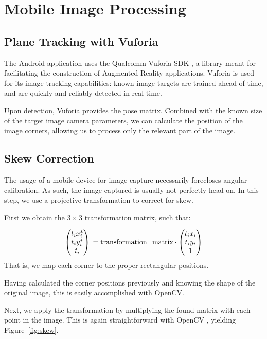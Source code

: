 \documentclass[11pt, letterpaper]{article}
\begin{document}
\section{Mobile Image Processing}

\subsection{Plane Tracking with Vuforia}
The Android application uses the Qualcomm Vuforia SDK \cite{vuforia}, a library meant for facilitating the construction of Augmented Reality applications.
Vuforia is used for its image tracking capabilities: known image targets are trained ahead of time, and are quickly and reliably detected in real-time.

Upon detection,	Vuforia provides the pose matrix. Combined with the known size of the target image camera parameters, we can calculate the position of the image corners, allowing us to process only the relevant part of the image.


\subsection{Skew Correction}
The usage of a mobile device for image capture necessarily forecloses angular calibration.
As such, the image captured is usually not perfectly head on.
In this step, we use a projective transformation to correct for skew.

First we obtain the $3 \times 3$ transformation matrix, such that:

$$
\begin{pmatrix}
t_i x_i^*\\
t_i y_i^*\\
t_i
\end{pmatrix}\\
= \text{transformation\_matrix} \cdot
\begin{pmatrix}
t_i x_i\\
t_i y_i\\
1
\end{pmatrix}
$$
That is, we map each corner to the proper rectangular positions.

Having calculated the corner positions previously and knowing the shape of the original image, this is easily accomplished with OpenCV\cite{opencv_getperspectivetransform}.

Next, we apply the transformation by multiplying the found matrix with each point in the image.
This is again straightforward with OpenCV \cite{opencv_warpperspective}, yielding Figure~\ref{fig:skew}.
\end{document}
